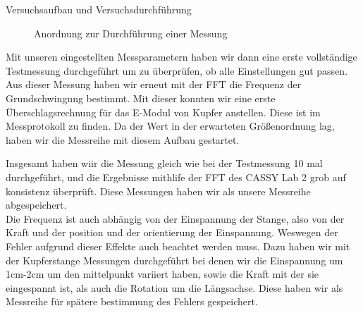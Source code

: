 \documentclass[twoside]{protokoll}
\begin{document}
\begin{aufgabe}{Versuchsaufbau und Versuchsdurchführung}
\begin{figure}[H]
  \centering
  \hfill
  \caption{Anordnung zur Durchführung einer Messung}
\end{figure}



Mit unseren eingestellten Messparametern haben wir dann eine erste vollständige Testmessung durchgeführt um zu überprüfen, ob alle Einstellungen gut passen. Aus dieser Messung haben wir erneut mit der FFT die Frequenz der Grundschwingung bestimmt. Mit dieser konnten wir eine erste Überschlagsrechnung für das E-Modul von Kupfer anstellen.
Diese ist im Messprotokoll zu finden. Da der Wert in der erwarteten Größenordnung lag, haben wir die Messreihe mit diesem Aufbau gestartet. 


Insgesamt haben wiir die Messung gleich wie bei der Testmessung 10 mal durchgeführt, und die Ergebnisse mithlife der FFT des CASSY Lab 2 grob auf konsistenz überprüft. Diese Messungen haben wir als unsere Messreihe abgespeichert.\\

Die Frequenz ist auch abhängig von der Einspannung der Stange, also von der Kraft und der position und der orientierung der Einspannung. Weswegen der Fehler aufgrund dieser Effekte auch beachtet werden muss. Dazu haben wir mit der Kupferstange Messungen durchgeführt bei denen wir die Einspannung um 1cm-2cm um den mittelpunkt variiert haben, sowie die Kraft mit der sie eingespannt ist, als auch die Rotation um die Längsachse.
Diese haben wir als Messreihe für spätere bestimmung des Fehlers gespeichert.\\


\end{aufgabe}
\end{document}

